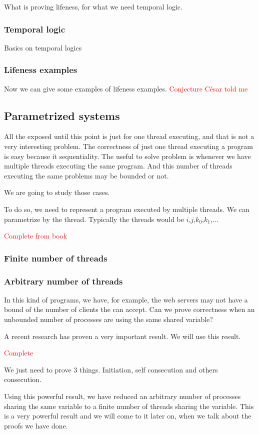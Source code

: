 What is proving lifeness, for what we need temporal logic.

\subsubsection{Temporal logic}

Basics on temporal logics

\subsubsection{Lifeness examples}

Now we can give some examples of lifeness examples. 
\textcolor{red}{Conjecture César told me}


\subsection{Parametrized systems}

All the exposed until this point is just for one thread executing, and that is not a very interesting problem. 
The correctness of just one thread executing a program is easy because it sequentiality.
The useful to solve problem is whenever we have multiple threads executing the same program. And this number of threads executing the same problems may be bounded or not. 

We are going to study those cases.

To do so, we need to represent a program executed by multiple threads. We can parametrize by the thread. Typically the threads would be $i$,$j$,$k_0$,$k_1$,... 

\textcolor{red}{Complete from book}

\subsubsection{Finite number of threads}


\subsubsection{Arbitrary number of threads}

In this kind of programs, we have, for example, the web servers may not have a bound of the number of clients the can accept. Can we prove correctness when an unbounded number of processes are using the same shared variable?

A recent research  has proven a very important result. We will use this result.

\textcolor{red}{Complete}
\begin{itheorem}
We just need to prove 3 things. Initiation, self consecution and others consecution.
\end{itheorem}
\label{thm:biggest}

Using this powerful result, we have reduced an arbitrary number of processes sharing the same variable to a finite number of threads sharing the variable. This is a very powerful result and we will come to it later on, when we talk about the proofs we have done. 
